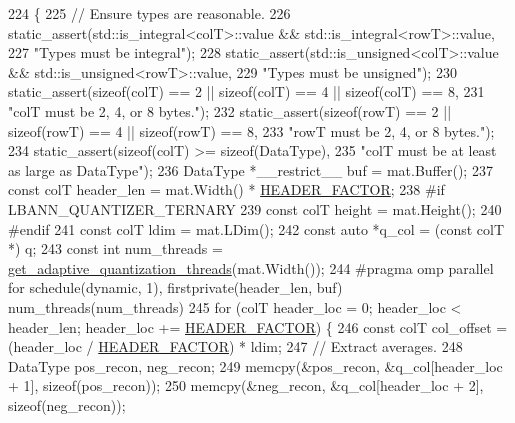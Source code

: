 \begin{DoxyCode}
224                            \{
225   \textcolor{comment}{// Ensure types are reasonable.}
226   static\_assert(std::is\_integral<colT>::value && std::is\_integral<rowT>::value,
227                 \textcolor{stringliteral}{"Types must be integral"});
228   static\_assert(std::is\_unsigned<colT>::value && std::is\_unsigned<rowT>::value,
229                 \textcolor{stringliteral}{"Types must be unsigned"});
230   static\_assert(\textcolor{keyword}{sizeof}(colT) == 2 || \textcolor{keyword}{sizeof}(colT) == 4 || \textcolor{keyword}{sizeof}(colT) == 8,
231                 \textcolor{stringliteral}{"colT must be 2, 4, or 8 bytes."});
232   static\_assert(\textcolor{keyword}{sizeof}(rowT) == 2 || \textcolor{keyword}{sizeof}(rowT) == 4 || \textcolor{keyword}{sizeof}(rowT) == 8,
233                 \textcolor{stringliteral}{"rowT must be 2, 4, or 8 bytes."});
234   static\_assert(\textcolor{keyword}{sizeof}(colT) >= \textcolor{keyword}{sizeof}(DataType),
235                 \textcolor{stringliteral}{"colT must be at least as large as DataType"});
236   DataType *\_\_restrict\_\_ buf = mat.Buffer();
237   \textcolor{keyword}{const} colT header\_len = mat.Width() * \hyperlink{classlbann_1_1lbann__quantizer_afb4315625e371169cabfac56c3f75d37}{HEADER\_FACTOR};
238 \textcolor{preprocessor}{#if LBANN\_QUANTIZER\_TERNARY}
239   \textcolor{keyword}{const} colT height = mat.Height();
240 \textcolor{preprocessor}{#endif}
241   \textcolor{keyword}{const} colT ldim = mat.LDim();
242   \textcolor{keyword}{const} \textcolor{keyword}{auto} *q\_col = (\textcolor{keyword}{const} colT *) q;
243   \textcolor{keyword}{const} \textcolor{keywordtype}{int} num\_threads = \hyperlink{classlbann_1_1lbann__quantizer_aaa0c20f755437130172c40ca8e95bc3f}{get\_adaptive\_quantization\_threads}(mat.Width());
244 \textcolor{preprocessor}{  #pragma omp parallel for schedule(dynamic, 1), firstprivate(header\_len, buf) num\_threads(num\_threads)}
245   \textcolor{keywordflow}{for} (colT header\_loc = 0; header\_loc < header\_len; header\_loc += \hyperlink{classlbann_1_1lbann__quantizer_afb4315625e371169cabfac56c3f75d37}{HEADER\_FACTOR}) \{
246     \textcolor{keyword}{const} colT col\_offset = (header\_loc / \hyperlink{classlbann_1_1lbann__quantizer_afb4315625e371169cabfac56c3f75d37}{HEADER\_FACTOR}) * ldim;
247     \textcolor{comment}{// Extract averages.}
248     DataType pos\_recon, neg\_recon;
249     memcpy(&pos\_recon, &q\_col[header\_loc + 1], \textcolor{keyword}{sizeof}(pos\_recon));
250     memcpy(&neg\_recon, &q\_col[header\_loc + 2], \textcolor{keyword}{sizeof}(neg\_recon));

\end{DoxyCode}
